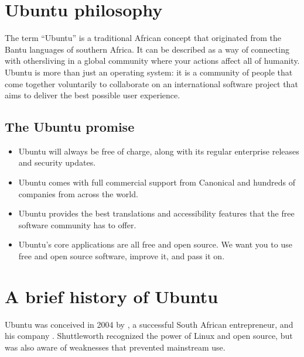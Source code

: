 \section{Ubuntu philosophy}
The term ``Ubuntu'' is a traditional African concept that originated from the Bantu languages of southern Africa. It can be described as a way of connecting with others\dash living in a global community where your actions affect all of humanity. Ubuntu is more than just an operating system: it is a community of people that come together voluntarily to collaborate on an international software project that aims to deliver the best possible user experience.

\subsection{The Ubuntu promise}

\begin{itemize}
  \item Ubuntu will always be free of charge, along with its regular
    enterprise releases and security updates.

  \item Ubuntu comes with full commercial support from \gls{Canonical} and
    hundreds of companies from across the world.

  \item Ubuntu provides the best translations and accessibility features
    that the free software community has to offer.

  \item Ubuntu's core applications are all free and open source. We want you
    to use free and open source software, improve it, and pass it on.
\end{itemize}


\section{A brief history of Ubuntu}

Ubuntu was conceived in 2004 by , a successful South African entrepreneur, and his company .  Shuttleworth recognized the power of Linux and open source, but was also aware of weaknesses that prevented mainstream use. 

